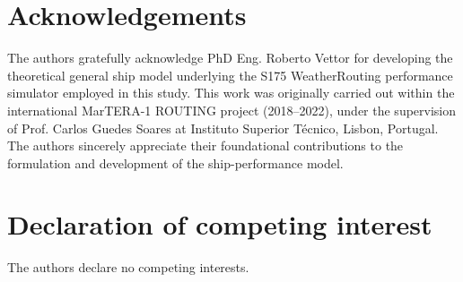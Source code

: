 \documentclass[final,5p,times,twocolumn,numbers]{elsarticle}
\begin{document}
\section*{Acknowledgements}
The authors gratefully acknowledge PhD Eng. Roberto Vettor for developing the theoretical general ship model underlying the S175 WeatherRouting performance simulator employed in this study. This work was originally carried out within the international MarTERA-1 ROUTING project (2018–2022), under the supervision of Prof. Carlos Guedes Soares at Instituto Superior Técnico, Lisbon, Portugal. The authors sincerely appreciate their foundational contributions to the formulation and development of the ship-performance model.
\section*{Declaration of competing interest}
The authors declare no competing interests.


\end{document}
